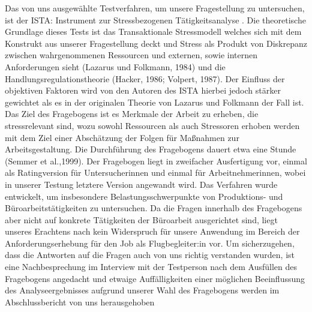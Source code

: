 \documentclass[12pt, a4paper]{article}
\begin{document}
Das von uns ausgewählte Testverfahren, um unsere Fragestellung zu untersuchen, 
ist der ISTA: Instrument zur Stressbezogenen Tätigkeitsanalyse 
\parencite{semmerISTAInstrumentZur1998}. 
Die theoretische Grundlage dieses Tests ist das Transaktionale Stressmodell 
welches sich mit dem Konstrukt aus unserer Fragestellung deckt und Stress
als Produkt von Diskrepanz zwischen wahrgenommenen Ressourcen und externen, 
sowie internen Anforderungen sieht (Lazarus und  Folkmann, 1984) 
und die Handlungsregulationstheorie (Hacker, 1986; Volpert,
1987). 
Der Einfluss der objektiven Faktoren wird von den Autoren des ISTA hierbei jedoch
stärker gewichtet als es in der originalen Theorie von Lazarus und Folkmann der Fall ist.
Das Ziel des Fragebogens ist es Merkmale der Arbeit zu erheben, die stressrelevant sind,
wozu sowohl Ressourcen als auch Stressoren erhoben werden mit dem Ziel einer
Abschätzung der Folgen für Maßnahmen zur Arbeitsgestaltung. Die Durchführung des
Fragebogens dauert etwa eine Stunde (Semmer et al.,1999).
Der Fragebogen liegt in zweifacher Ausfertigung vor, einmal als Ratingversion für
Untersucherinnen und einmal für Arbeitnehmerinnen, wobei in unserer Testung letztere
Version angewandt wird. Das Verfahren wurde entwickelt, um insbesondere
Belastungsschwerpunkte von Produktions- und Büroarbeitstätigkeiten zu untersuchen. Da
die Fragen innerhalb des Fragebogens aber nicht auf konkrete Tätigkeiten der Büroarbeit
ausgerichtet sind, liegt unseres Erachtens nach kein Widerspruch für unsere Anwendung im
Bereich der Anforderungserhebung für den Job als Flugbegleiter:in vor. Um sicherzugehen,
dass die Antworten auf die Fragen auch von uns richtig verstanden wurden, ist eine
Nachbesprechung im Interview mit der Testperson nach dem Ausfüllen des Fragebogens
angedacht und etwaige Auffälligkeiten einer möglichen Beeinflussung des
Analyseergebnisses aufgrund unserer Wahl des Fragebogens werden im Abschlussbericht
von uns herausgehoben
\end{document}
